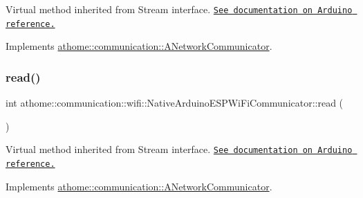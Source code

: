 Virtual method inherited from Stream interface. \href{https://www.arduino.cc/reference/en/language/functions/communication/stream/streampeek/}{\tt See documentation on Arduino reference.} 

Implements \mbox{\hyperlink{classathome_1_1communication_1_1_a_network_communicator_ad06ecdc94aa77b1bab934b85bed2ac7d}{athome\+::communication\+::\+A\+Network\+Communicator}}.

\mbox{\label{classathome_1_1communication_1_1wifi_1_1_native_arduino_e_s_p_wi_fi_communicator_a07da3b2bf99edad18fb95b6879dbf0f7}} 
\subsubsection{\texorpdfstring{read()}{read()}}
{\footnotesize\ttfamily int athome\+::communication\+::wifi\+::\+Native\+Arduino\+E\+S\+P\+Wi\+Fi\+Communicator\+::read (\begin{DoxyParamCaption}{ }\end{DoxyParamCaption})\hspace{0.3cm}{\ttfamily [virtual]}}

Virtual method inherited from Stream interface. \href{https://www.arduino.cc/reference/en/language/functions/communication/stream/streamread/}{\tt See documentation on Arduino reference.} 

Implements \mbox{\hyperlink{classathome_1_1communication_1_1_a_network_communicator_a88d3c4366daf48865ab48b22eb62d610}{athome\+::communication\+::\+A\+Network\+Communicator}}.

\mbox{\label{classathome_1_1communication_1_1wifi_1_1_native_arduino_e_s_p_wi_fi_communicator_a99fab41ad5275649efafa0a776a0348f}} 
